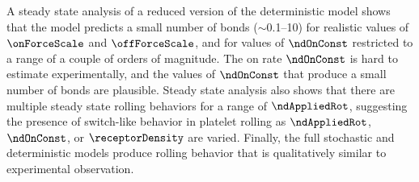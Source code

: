 A steady state analysis of a reduced version of the deterministic
model shows that the model predicts a small number of bonds
($\sim$0.1--10) for realistic values of $\onForceScale$ and
$\offForceScale$, and for values of $\ndOnConst$ restricted to a range
of a couple of orders of magnitude. The on rate $\ndOnConst$ is hard
to estimate experimentally, and the values of $\ndOnConst$ that
produce a small number of bonds are plausible. Steady state analysis
also shows that there are multiple steady state rolling behaviors for
a range of $\ndAppliedRot$, suggesting the presence of switch-like
behavior in platelet rolling as $\ndAppliedRot$, $\ndOnConst$, or
$\receptorDensity$ are varied. Finally, the full stochastic and
deterministic models produce rolling behavior that is qualitatively
similar to experimental observation.

